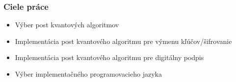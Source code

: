 \documentclass[%
  14pt,       				%
	t,                  %
	aspectratio=1610,   %
	unicode,						%
]{beamer}				    	%
\begin{document}
\disablenavigationsymbols

\maketitle


\begin{frame}[c]
	\frametitle{Ciele práce}
	\large{\begin{itemize}
			\item Výber post kvantových algoritmov
			\item Implementácia post kvantového algoritmu pre výmenu kľúčov/šifrovanie
			\item Implementácia post kvantového algoritmu pre digitálny podpis
			\item Výber implementačného programovacieho jazyka
		\end{itemize}}

\end{frame}




\end{document}
